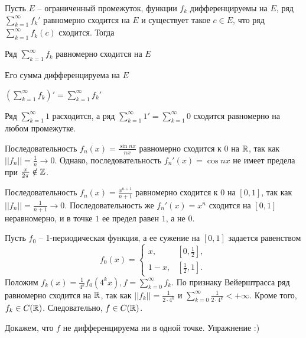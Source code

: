 \begin{Thm}
	Пусть $E$ -- ограниченный промежуток, функции $f_k$ дифференцируемы на $E$, ряд $\sum_{k=1}^{\infty} f_k'$ равномерно сходится на $E$ и существует такое $c \in E$, что ряд $\sum_{k=1}^{\infty} f_k(c)$ сходится. 
	Тогда 
	\begin{MyList}
		\item Ряд $\sum_{k=1}^{\infty} f_k$ равномерно сходится на $E$
		\item Его сумма дифференцируема на $E$
		\item $\left(\sum_{k=1}^{\infty} f_k\right)' = \sum_{k=1}^{\infty} f_k'$  
	\end{MyList}
\end{Thm}

\begin{Example}
	Ряд $\sum_{k=1}^{\infty} 1$ расходится, а ряд $\sum_{k=1}^{\infty} 1' = \sum_{k=1}^{\infty} 0$ сходится равномерно на любом промежутке.  
\end{Example}

\begin{Example}
	Последовательность $f_n(x) = \frac{\sin nx}{nx}$ равномерно сходится к $0$ на $\mathbb{R}$, так как $||f_n|| = \frac{1}{n} \to 0$. Однако, последовательность $f_n'(x) = \cos nx$ не имеет предела при $\frac{x}{2\pi} \notin \mathbb{Z}$.  
\end{Example}

\begin{Example}
	Последовательность $f_n(x) = \frac{x^{n + 1}}{n + 1}$ равномерно сходится к $0$ на $[0, 1]$, так как $||f_n|| = \frac{1}{n + 1} \to 0$. Последовательность же $f_n'(x) = x^n$ сходится на $[0, 1]$ неравномерно, и в точке $1$ ее предел равен $1$, а не $0$.  
\end{Example}

\begin{Example}
	Пусть $f_0$ -- 1-периодическая функция, а ее сужение на $[0, 1]$ задается равенством
	\[f_0(x) = \begin{cases}
		x, &\left[0, \frac{1}{2}\right], \\
		1 - x, &\left[\frac{1}{2}, 1\right].
	\end{cases}\]
	Положим $f_k(x) = \frac{1}{4^k}f_0(4^k x), f = \sum_{k=0}^{\infty} f_k$. 
	По признаку Вейерштрасса ряд равномерно сходится на $\mathbb{R}$, так как $||f_k|| = \frac{1}{2 \cdot 4^k}$ и $\sum_{k=0}^{\infty} \frac{1}{2 \cdot 4^k} < +\infty$. Кроме того, $f_k \in C(\mathbb{R})$. Следовательно, $f \in C(\mathbb{R})$.
	
	Докажем, что $f$ не дифференцируема ни в одной точке. Упражнение :)
\end{Example}

